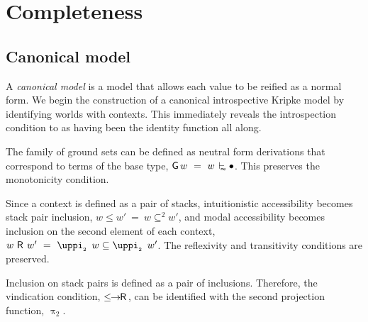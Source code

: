 \documentclass[submission,copyright,creativecommons,sharealike,backref=page]{eptcs}
\renewcommand{\leq}{\mathrel{\subseteq}}
\newcommand{\leqII}{\mathrel{\subseteq^{\scriptscriptstyle{2}}}}
\newcommand{\R}{\mathrel{\rlap{$\mkern.75mu\textsf{R}$}\hphantom{\subseteq}}}
\renewcommand{\:}{\mathop{\mkern3mu:\mkern3mu}}
\renewcommand{\.}{\mathop{\mkern3mu.\mkern3mu}}
\renewcommand{\;}{\mathop{;}}
\renewcommand{\,}{\mathop{,}}
\newcommand{\ene}{\mathrel{\mkern2mu\vdash_{\mkern-9mu\scriptscriptstyle{\textsf{ne}}}}}
\renewcommand{\r}{\mathrel{\rightarrow\mkern-1mu}}
\newcommand{\piii}{\operatorname{\uppi_{\scriptscriptstyle{2}}}}
\newcommand{\lerR}{\operatorname{\le\mkern-1mu\r\mkern-1mu\R}}
\newcommand{\G}{\operatorname{\textsf{G}}}
\newcommand{\base}{\mathop{\bullet}}
\theoremstyle{mystyle}
\begin{document}
\section{Completeness}\label{Completeness}

\subsection{Canonical model}

A \emph{canonical model} is a model that allows each value to be reified as a normal form.  We begin the construction of a canonical introspective Kripke model by identifying worlds with contexts.  This immediately reveals the introspection condition to as having been the identity function all along.

The family of ground sets can be defined as neutral form derivations that correspond to terms of the base type, $\G w ~=~ w \ene \base$.  This preserves the monotonicity condition.

Since a context is defined as a pair of stacks, intuitionistic accessibility becomes stack pair inclusion, $w \le w' ~=~ w \leqII w'$, and modal accessibility becomes inclusion on the second element of each context, $w \R w' ~=~ \piii~w \leq \piii~w'$.  The reflexivity and transitivity conditions are preserved.

Inclusion on stack pairs is defined as a pair of inclusions.  Therefore, the vindication condition, $\lerR$, can be identified with the second projection function, $\piii$.
\end{document}
